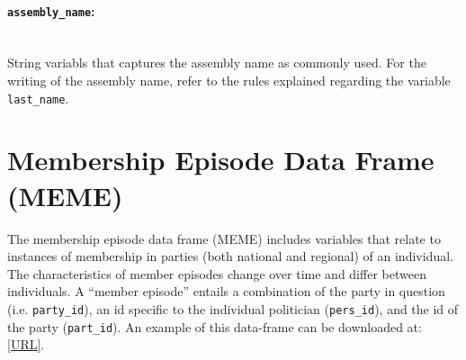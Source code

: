 \documentclass{article}
\begin{document}

\paragraph{\texttt{assembly\_name}:}\\
String variabls that captures the assembly name as commonly used. For the writing of the assembly name, refer to the rules explained regarding the variable \texttt{last\_name}.

\section{Membership Episode Data Frame (\gls{MEME})}\label{MEME}
The membership episode data frame (\gls{MEME}) includes variables that relate to instances of membership in parties (both national and regional) of an individual. The characteristics of member episodes change over time and differ between individuals. A ``member episode'' entails a combination of the party in question (i.e. \texttt{party\_id}), an id specific to the individual politician (\texttt{pers\_id}), and the id of the party (\texttt{part\_id}). An example of this data-frame can be downloaded at: \url{[URL]}.

\end{document}
